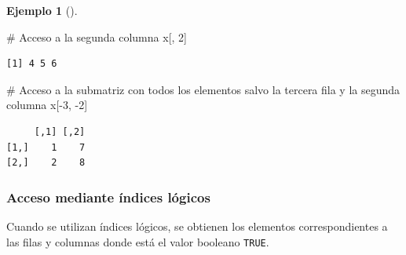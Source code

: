 \documentclass[
  spanish,
  a4paper,
]{scrreport}
\newenvironment{Shaded}{\begin{snugshade}}{\end{snugshade}}
\newcommand{\CommentTok}[1]{\textcolor[rgb]{0.37,0.37,0.37}{#1}}
\newcommand{\DecValTok}[1]{\textcolor[rgb]{0.68,0.00,0.00}{#1}}
\newcommand{\NormalTok}[1]{\textcolor[rgb]{0.00,0.23,0.31}{#1}}
\newcommand{\SpecialCharTok}[1]{\textcolor[rgb]{0.37,0.37,0.37}{#1}}
\theoremstyle{definition}
\theoremstyle{definition}
\newtheorem{example}{Ejemplo}[chapter]
\theoremstyle{remark}
\begin{document}
\begin{example}[]
\begin{Shaded}
\begin{Highlighting}[]
\CommentTok{\# Acceso a la segunda columna}
\NormalTok{x[, }\DecValTok{2}\NormalTok{]}
\end{Highlighting}
\end{Shaded}

\begin{verbatim}
[1] 4 5 6
\end{verbatim}

\begin{Shaded}
\begin{Highlighting}[]
\CommentTok{\# Acceso a la submatriz con todos los elementos salvo la tercera fila y la segunda columna}
\NormalTok{x[}\SpecialCharTok{{-}}\DecValTok{3}\NormalTok{, }\SpecialCharTok{{-}}\DecValTok{2}\NormalTok{]}
\end{Highlighting}
\end{Shaded}

\begin{verbatim}
     [,1] [,2]
[1,]    1    7
[2,]    2    8
\end{verbatim}

\end{example}

\subsubsection{Acceso mediante índices
lógicos}\label{acceso-mediante-uxedndices-luxf3gicos}

Cuando se utilizan índices lógicos, se obtienen los elementos
correspondientes a las filas y columnas donde está el valor booleano
\texttt{TRUE}.
\end{document}

